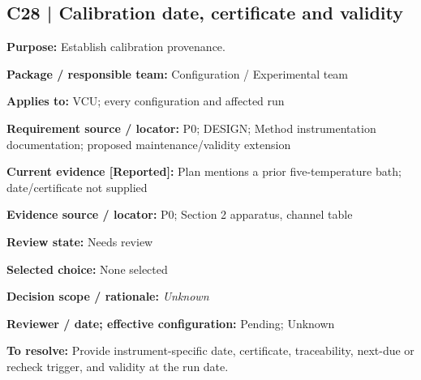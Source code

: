 \documentclass[11pt]{article}
\begin{document}
\par\noindent\begin{minipage}{\textwidth}\small\setlength{\parskip}{2pt}
\subsection*{C28 | Calibration date, certificate and validity}
\textbf{Purpose:} Establish calibration provenance.\par
\textbf{Package / responsible team:} Configuration / Experimental team\par
\textbf{Applies to:} VCU; every configuration and affected run\par
\textbf{Requirement source / locator:} P0; DESIGN; Method instrumentation documentation; proposed maintenance/validity extension\par
\textbf{Current evidence [Reported]:} Plan mentions a prior five-temperature bath; date/certificate not supplied\par
\textbf{Evidence source / locator:} P0; Section 2 apparatus, channel table\par
\textbf{Review state:} Needs review\par
\textbf{Selected choice:} None selected\par
\textbf{Decision scope / rationale:} \textit{Unknown}\par
\textbf{Reviewer / date; effective configuration:} Pending; Unknown\par
\textbf{To resolve:} Provide instrument-specific date, certificate, traceability, next-due or recheck trigger, and validity at the run date.\par
\end{minipage}\par\vspace{5pt}
\end{document}
